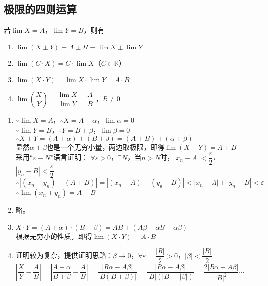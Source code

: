 \documentclass[11pt,fleqn]{book} %
\begin{document}
\subsection{极限的四则运算}
若$\lim X = A$，$\lim Y = B$，则有
\begin{enumerate}[label=(\arabic*)]
  \item $\lim(X\pm Y) = A \pm B = \lim X \pm \lim Y$\label{limpm}
  \item $\lim (C\cdot X) = C \cdot \lim X $（$C \in \mathds{R}$）
  \item $\lim (X\cdot Y) = \lim X \cdot \lim Y = A \cdot B$
  \item $\lim \left(\dfrac{X}{Y}\right)=\dfrac{\lim X}{\lim Y}= \dfrac{A}{B}$ ，$B\neq 0$
\end{enumerate}
\begin{prove}
\begin{enumerate}[label=(\arabic*)]
  \item $\because \lim X = A$，$\therefore X = A+\alpha$，$\lim \alpha = 0$\\
  $\because \lim Y = B$，$\therefore Y = B+\beta$，$\lim \beta = 0$\\
  $\therefore X \pm Y = (A+\alpha) \pm (B+\beta)=(A \pm B)+(\alpha \pm \beta)$\\
  显然$\alpha \pm \beta$也是一个无穷小量，两边取极限，即得$\lim (X\pm Y)=A\pm B$\\
  采用“$\varepsilon-N$”语言证明：
  $\forall \varepsilon>0$，$\exists N$，当$n>N$时，$|x_n-A|<\dfrac{\varepsilon}{2}$，$|y_n-B|<\dfrac{\varepsilon}{2}$\\
  $\therefore |(x_n\pm y_n)-(A\pm B)|=|(x_n-A)\pm (y_n-B)|<|x_n-A|+|y_n-B|<\varepsilon$\\
  $\therefore \lim (x_n\pm y_n) = A \pm B$
  \item 略。
  \item $X \cdot Y = (A+\alpha)\cdot(B+\beta)=AB+(A\beta+\alpha B+\alpha\beta)$\\
  根据无穷小的性质，即得$\lim (X \cdot Y)=A\cdot B$
  \item 证明较为复杂，提供证明思路：$\beta\rightarrow 0$，$\forall \varepsilon = \dfrac{|B|}{2}>0$，$|\beta|<\dfrac{|B|}{2}$\\
  $\left|\dfrac{X}{Y}-\dfrac{A}{B}\right|=\left|\dfrac{A+\alpha}{B+\beta}-\dfrac{A}{B}\right|=\dfrac{|B\alpha-A\beta|}{|B(B+\beta)|}=\dfrac{|B\alpha-A\beta|}{|B|(|B|-|\beta|)}=\dfrac{2|B\alpha-A\beta|}{|B|^2}\cdots$
\end{enumerate}
\end{prove}
\end{document}
